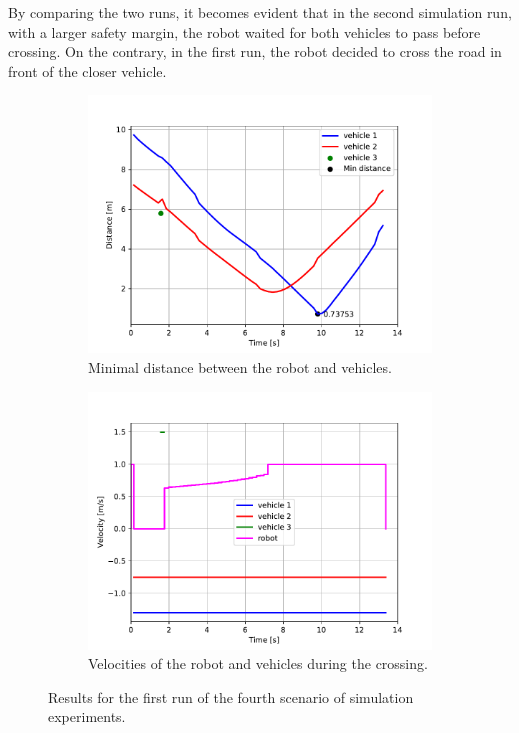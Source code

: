             By comparing the two runs, it becomes evident that in the second simulation run, with a larger safety margin, the robot waited for both vehicles to pass before crossing. On the contrary, in the first run, the robot decided to cross the road in front of the closer vehicle.\\
            \begin{figure}[H]
                \centering
                \begin{subfigure}{0.49\linewidth}
                    \centering
                    \includegraphics[trim={13 8 40 41}, clip, width=\linewidth]{images/simulations/scene4_1_dist.pdf}
                    \caption{Minimal distance between the robot and vehicles.}
                \end{subfigure}
                \begin{subfigure}{0.49\linewidth}
                    \centering
                    \includegraphics[trim={13 8 40 41}, clip, width=\linewidth]{images/simulations/scene4_1_vel.pdf}
                    \caption{Velocities of the robot and vehicles during the crossing.}
                \end{subfigure}
                \caption{Results for the first run of the fourth scenario of simulation experiments.}
                \label{fig:scene4_1_graphs}
            \end{figure}
